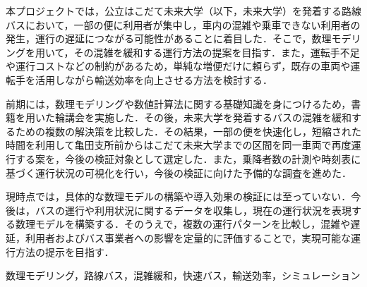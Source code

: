 \documentclass[openany,11pt,papersize,dvipdfm]{jsbook}
\begin{document}
\maketitle

\frontmatter

\begin{jabstract}\setlength{\parindent}{1zw}%
\hspace{1zw}本プロジェクトでは，公立はこだて未来大学（以下，未来大学）を発着する路線バスにおいて，一部の便に利用者が集中し，車内の混雑や乗車できない利用者の発生，運行の遅延につながる可能性があることに着目した．そこで，数理モデリングを用いて，その混雑を緩和する運行方法の提案を目指す．また，運転手不足や運行コストなどの制約があるため，単純な増便だけに頼らず，既存の車両や運転手を活用しながら輸送効率を向上させる方法を検討する．

前期には，数理モデリングや数値計算法に関する基礎知識を身につけるため，書籍を用いた輪講会を実施した．その後，未来大学を発着するバスの混雑を緩和するための複数の解決策を比較した．その結果，一部の便を快速化し，短縮された時間を利用して亀田支所前からはこだて未来大学までの区間を同一車両で再度運行する案を，今後の検証対象として選定した．また，乗降者数の計測や時刻表に基づく運行状況の可視化を行い，今後の検証に向けた予備的な調査を進めた．

現時点では，具体的な数理モデルの構築や導入効果の検証には至っていない．今後は，バスの運行や利用状況に関するデータを収集し，現在の運行状況を表現する数理モデルを構築する．そのうえで，複数の運行パターンを比較し，混雑や遅延，利用者およびバス事業者への影響を定量的に評価することで，実現可能な運行方法の提示を目指す．
\begin{jkeyword}
数理モデリング，路線バス，混雑緩和，快速バス，輸送効率，シミュレーション
\end{jkeyword}
\end{jabstract}
\end{document}
